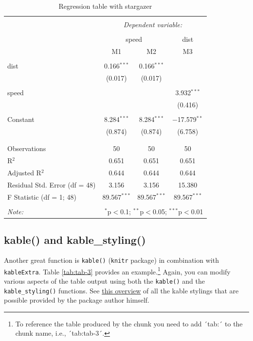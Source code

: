 \documentclass[
  12pt,
]{article}
\begin{document}
\begin{table}[H] \centering 
  \caption{Regression table with stargazer} 
  \label{tab-2} 
\begin{tabular}{@{\extracolsep{5pt}}lccc} 
\\[-1.8ex]\hline 
\hline \\[-1.8ex] 
 & \multicolumn{3}{c}{\textit{Dependent variable:}} \\ 
\cline{2-4} 
\\[-1.8ex] & \multicolumn{2}{c}{speed} & dist \\ 
 & M1 & M2 & M3 \\ 
\hline \\[-1.8ex] 
 dist & 0.166$^{***}$ & 0.166$^{***}$ &  \\ 
  & (0.017) & (0.017) &  \\ 
  & & & \\ 
 speed &  &  & 3.932$^{***}$ \\ 
  &  &  & (0.416) \\ 
  & & & \\ 
 Constant & 8.284$^{***}$ & 8.284$^{***}$ & $-$17.579$^{**}$ \\ 
  & (0.874) & (0.874) & (6.758) \\ 
  & & & \\ 
\hline \\[-1.8ex] 
Observations & 50 & 50 & 50 \\ 
R$^{2}$ & 0.651 & 0.651 & 0.651 \\ 
Adjusted R$^{2}$ & 0.644 & 0.644 & 0.644 \\ 
Residual Std. Error (df = 48) & 3.156 & 3.156 & 15.380 \\ 
F Statistic (df = 1; 48) & 89.567$^{***}$ & 89.567$^{***}$ & 89.567$^{***}$ \\ 
\hline 
\hline \\[-1.8ex] 
\textit{Note:}  & \multicolumn{3}{r}{$^{*}$p$<$0.1; $^{**}$p$<$0.05; $^{***}$p$<$0.01} \\ 
\end{tabular} 
\end{table}

\hypertarget{kable-and-kable_styling}{%
\subsection{kable() and kable\_styling()}\label{kable-and-kable_styling}}

Another great function is \texttt{kable()} (\texttt{knitr} package) in combination with \texttt{kableExtra}. Table \ref{tab:tab-3} provides an example.\footnote{To reference the table produced by the chunk you need to add ´tab:´ to the chunk name, i.e., ´tab:tab-3´.} Again, you can modify various aspects of the table output using both the \texttt{kable()} and the \texttt{kable\_styling()} functions. See \href{https://haozhu233.github.io/kableExtra/awesome_table_in_pdf.pdf}{this overview} of all the kable stylings that are possible provided by the package author himself.
\end{document}
